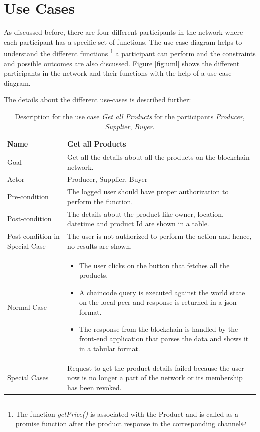 \documentclass[
  a4paper,  %
  twoside,  %
  bibliography=totoc,
  headsepline,
  cleardoublepage=empty,
  parskip=half,
  draft=false
]{scrbook}
\begin{document}
\section{Use Cases}
As discussed before, there are four different participants in the network where each participant has a specific set of functions. The use case diagram helps to understand the different functions \footnote{The function \textit{getPrice()} is associated with the Product and is called as a promise function after the product response in the corresponding channel} a participant can perform and the constraints and possible outcomes are also discussed. Figure \ref{fig:uml} shows the different participants in the network and their functions with the help of a use-case diagram.

The details about the different use-cases is described further: 


\begin{table}[h!]
\begin{center}
    \begin{tabular}{ | l | p{9cm} |}
    \hline
    \textbf{Name} & \textbf{Get all Products} \\ \hline
    Goal & Get all the details about all the products on the blockchain network. \\ \hline
    Actor & Producer, Supplier, Buyer \\ \hline
    Pre-condition & The logged user should have proper authorization to perform the function. \\ \hline
    Post-condition & The details about the product like owner, location, datetime and product Id are shown in a table. \\ \hline
    Post-condition in Special Case & The user is not authorized to perform the action and hence, no results are shown.\\ \hline
    Normal Case & \begin{itemize}
        \item The user clicks on the button that fetches all the products.
        \item A chaincode query is executed against the world state on the local peer and response is returned in a json format.
        \item The response from the blockchain is handled by the front-end application that parses the data and shows it in a tabular format.
    \end{itemize}\\ \hline
    Special Cases & Request to get the product details failed because the user now is no longer a part of the network or its membership has been revoked. \\ \hline
    \end{tabular}
\end{center}
\caption{Description for the use case \textit{Get all Products} for the participants \textit{Producer}, \textit{Supplier}, \textit{Buyer}.}
    \label{tab:uc1}
\end{table}
\end{document}
